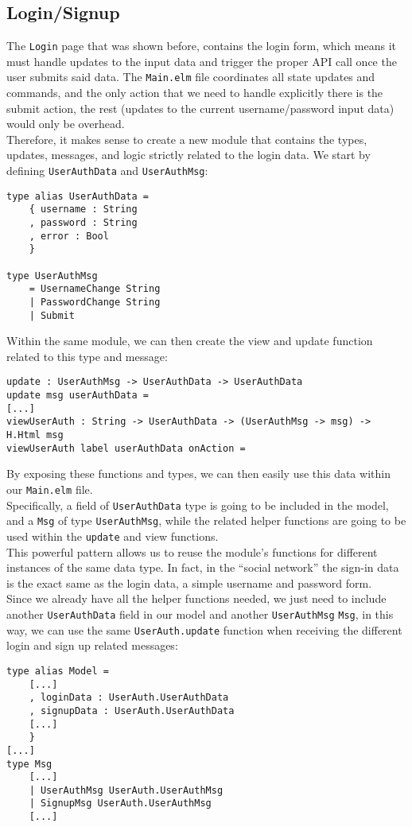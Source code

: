 \subsection{Login/Signup}

The \texttt{Login} page that was shown before, contains the login form, which means it must handle updates to the input data and trigger the proper API call once the user submits said data. The \texttt{Main.elm} file coordinates all state updates and commands, and the only action that we need to handle explicitly there is the submit action, the rest (updates to the current username/password input data) would only be overhead.\\
Therefore, it makes sense to create a new module that contains the types, updates, messages, and logic strictly related to the login data. We start by defining \texttt{UserAuthData} and \texttt{UserAuthMsg}:
\begin{verbatim}
type alias UserAuthData =
    { username : String
    , password : String
    , error : Bool
    }

type UserAuthMsg
    = UsernameChange String
    | PasswordChange String
    | Submit
\end{verbatim}

Within the same module, we can then create the view and update function related to this type and message:
\begin{verbatim}
update : UserAuthMsg -> UserAuthData -> UserAuthData
update msg userAuthData =
[...]
viewUserAuth : String -> UserAuthData -> (UserAuthMsg -> msg) -> H.Html msg
viewUserAuth label userAuthData onAction =
\end{verbatim}

By exposing these functions and types, we can then easily use this data within our \texttt{Main.elm} file.\\
Specifically, a field of \texttt{UserAuthData} type is going to be included in the model, and a \texttt{Msg} of type \texttt{UserAuthMsg}, while the related helper functions are going to be used within the \texttt{update} and view functions.\\

This powerful pattern allows us to reuse the module's functions for different instances of the same data type. In fact, in the ``social network'' the sign-in data is the exact same as the login data, a simple username and password form.\\ Since we already have all the helper functions needed, we just need to include another \texttt{UserAuthData} field in our model and another \texttt{UserAuthMsg}  \texttt{Msg}, in this way, we can use the same \texttt{UserAuth.update} function when receiving the different login and sign up related messages:
\begin{verbatim}  
type alias Model =
    [...]
    , loginData : UserAuth.UserAuthData
    , signupData : UserAuth.UserAuthData
    [...]
    }
[...]
type Msg
    [...]
    | UserAuthMsg UserAuth.UserAuthMsg
    | SignupMsg UserAuth.UserAuthMsg
    [...]
\end{verbatim}


